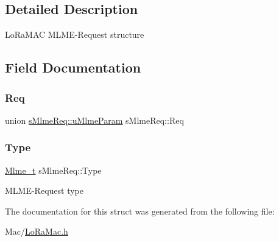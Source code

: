 \subsection{Detailed Description}
Lo\+Ra\+M\+AC M\+L\+M\+E-\/\+Request structure 

\subsection{Field Documentation}
\mbox{\label{structsMlmeReq_a6f57f62db1981b24980a7745b966a469}} 
\subsubsection{\texorpdfstring{Req}{Req}}
{\footnotesize\ttfamily union \hyperlink{unionsMlmeReq_1_1uMlmeParam}{s\+Mlme\+Req\+::u\+Mlme\+Param} s\+Mlme\+Req\+::\+Req}

\mbox{\label{structsMlmeReq_ab7870d559ad9c5a08d305220bf798cd3}} 
\subsubsection{\texorpdfstring{Type}{Type}}
{\footnotesize\ttfamily \hyperlink{group__LORAMAC_ga663544b83d50ec3518608be495896809}{Mlme\+\_\+t} s\+Mlme\+Req\+::\+Type}

M\+L\+M\+E-\/\+Request type 

The documentation for this struct was generated from the following file\+:\begin{DoxyCompactItemize}
\item 
Mac/\hyperlink{LoRaMac_8h}{Lo\+Ra\+Mac.\+h}\end{DoxyCompactItemize}
